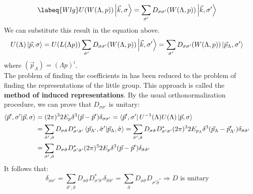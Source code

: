 \documentclass[../main.tex]{subfiles}
\begin{document}
\begin{equation}
\labeq{Wlg}
U(W(\Lambda,p))\ket{\vec{k},\sigma}=\sum_{\sigma'}D_{\sigma\sigma'}(W(\Lambda,p))\ket{\vec{k},\sigma'}
\end{equation}
We can substitute this result in the equation above.
\[
U(\Lambda)\ket{\vec{p},\sigma}=U(L(\Lambda p))\sum_{\sigma'}D_{\sigma\sigma'}(W(\Lambda,p))\ket{\vec{k},\sigma'}=\sum_{\sigma'}D_{\sigma\sigma'}(W(\Lambda,p))\ket{\vec{p}_\Lambda,\sigma'}
\]
where $(\vec{p}_\Lambda)=(\Lambda p)^i$.\\
The problem of finding the coefficients in  has been reduced to the problem of finding the representations of the little group. This approach is called the \textbf{method of induced representations}.
By the usual orthonormalization procedure, we can prove that $D_{\sigma\sigma'}$ is unitary:
\begin{align*}
\bra{\vec{p}',\sigma'}\ket{\vec{p},\sigma}&=(2\pi)^32E_p\delta^3(\vec{p}-\vec{p}')\delta_{\sigma\sigma'}=\bra{\vec{p}',\sigma'}U^{-1}(\Lambda)U(\Lambda)\ket{\vec{p},\sigma}\\
&=\sum_{\hat{\sigma}',\hat{\sigma}}D_{\sigma\hat{\sigma}}D_{\sigma'\hat{\sigma}'}^*\bra{\vec{p}_{\Lambda'},\hat{\sigma}'}\ket{\vec{p}_\Lambda,\hat{\sigma}}=\sum_{\hat{\sigma}',\hat{\sigma}}D_{\sigma\hat{\sigma}}D_{\sigma'\hat{\sigma}'}^*(2\pi)^32E_{p_{\Lambda}}\delta^3(\vec{p}_\Lambda-\vec{p}'_{\Lambda'})\delta_{\hat{\sigma}\hat{\sigma}'}\\
&=\sum_{\hat{\sigma}',\hat{\sigma}}D_{\sigma\hat{\sigma}}D_{\sigma'\hat{\sigma}'}^*(2\pi)^32E_p\delta^3(\vec{p}-\vec{p}')\delta_{\hat{\sigma}\hat{\sigma}'}
\end{align*}
It follows that:
\[
\delta_{\sigma\sigma'}=\sum_{\hat{\sigma}',\hat{\sigma}}D_{\sigma\hat{\sigma}}D_{\sigma'\hat{\sigma}'}^*\delta_{\hat{\sigma}\hat{\sigma}'}=\sum_{\hat{\sigma}}D_{\sigma\hat{\sigma}}D_{\sigma'\hat{\sigma}^*}\Rightarrow\text{$D$ is unitary}
\]
\end{document}
